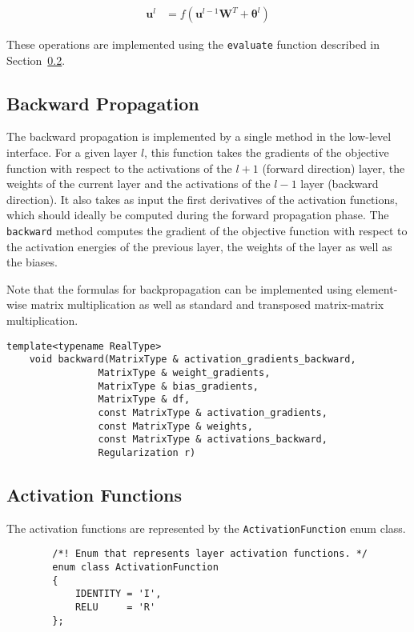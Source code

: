 \documentclass[a4paper,11pt,bibtotoc,xcolor=dvipsnames]{scrartcl}
\newcommand*{\code}[1]{\texttt{#1}}
\begin{document}
\begin{align}
  \mathbf{u}^l &= f \left ( \mathbf{u}^{l-1} \mathbf{W}^T + \boldsymbol{\theta}^l
                 \right )
\end{align}

These operations are implemented using the \code{evaluate} function described in
Section~\ref{ss:activations}.

\subsection{Backward Propagation}

The backward propagation is implemented by a single method in the
low-level interface. For a given layer $l$, this function takes the
gradients of the objective function with respect to the activations of
the $l+1$ (forward direction) layer, the weights of the current layer
and the activations of the $l-1$ layer (backward direction).  It
also takes as input the first derivatives of the activation functions, which
should ideally be computed during the forward propagation phase. The
\code{backward} method computes the gradient of the objective function with
 respect to the activation energies of the previous layer, the weights of
 the layer as well as the biases.

Note that the formulas for backpropagation can be implemented using
element-wise matrix multiplication as well as standard and transposed
matrix-matrix multiplication.

\begin{verbatim}
template<typename RealType>
    void backward(MatrixType & activation_gradients_backward,
                MatrixType & weight_gradients,
                MatrixType & bias_gradients,
                MatrixType & df,
                const MatrixType & activation_gradients,
                const MatrixType & weights,
                const MatrixType & activations_backward,
                Regularization r)
\end{verbatim}

\subsection{Activation Functions}\label{ss:activations}

The activation functions are represented by the \code{ActivationFunction} enum
class.

\begin{verbatim}
        /*! Enum that represents layer activation functions. */
        enum class ActivationFunction
        {
            IDENTITY = 'I',
            RELU     = 'R'
        };
\end{verbatim}
\end{document}

